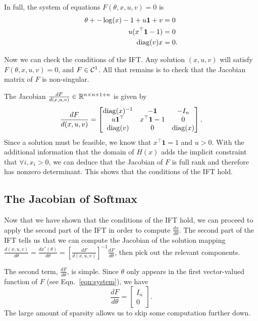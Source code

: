 \documentclass[11pt]{article}
\begin{document}
In full, the system of equations $F(\theta, x,u,v) = 0$ is
\begin{equation}
\label{eqn:system}
\begin{aligned}
\theta + -\log(x) - 1 + u\mathbf{1} + v &= 0\\
u(x^{\top} \mathbf{1} - 1) &= 0\\
\mathrm{diag}(v)x &= 0.
\end{aligned}
\end{equation}

Now we can check the conditions of the IFT.
Any solution $(x,u,v)$ will satisfy $F(\theta, x,u,v) = 0$,
and $F \in \mathcal{C}^1$.
All that remains is to check that the Jacobian matrix of $F$ is non-singular.

The Jacobian $\frac{dF}{d(x,u,v)}\in\mathbb{R}^{n\times n+1+n}$ is given by
\begin{equation}
\label{eqn:f-jac}
\frac{dF}{d(x,u,v)}=
\begin{bmatrix}
\mathrm{diag}(x)^{-1} & -\mathbf{1} & -I_n \\
u\mathbf{1}^\top & x^\top\mathbf{1} - 1 & 0\\
\mathrm{diag}(v) & 0 & \mathrm{diag}(x)
\end{bmatrix}.
\end{equation}
Since a solution must be feasible, we know that $x^\top\mathbf{1} = 1$ and $u > 0$.
With the additional information that the domain of $H(x)$
adds the implicit constraint that $\forall i, x_i > 0$,
we can deduce that the Jacobian of $F$ is full rank and therefore has nonzero determinant.
This shows that the conditions of the IFT hold.


\subsection{The Jacobian of Softmax}
Now that we have shown that the conditions of the IFT hold,
we can proceed to apply the second part of the IFT in order to compute $\frac{dx}{d\theta}$.
The second part of the IFT tells us that we can compute the Jacobian of the
solution mapping $\frac{d(x,u,v)}{d\theta} = \frac{dx^*(\theta)}{d\theta}
= \left[\frac{dF}{d(x,u,v)}\right]^{-1}\frac{dF}{d\theta}$,
then pick out the relevant components.

The second term, $\frac{dF}{d\theta}$, is simple.
Since $\theta$ only appears in the first vector-valued function of $F$
(see Eqn.~\ref{eqn:system}), we have
\begin{equation}
\label{eqn:df-dtheta}
\frac{dF}{d\theta} = \begin{bmatrix}
    I_n\\
    0
\end{bmatrix}.
\end{equation}
The large amount of sparsity allows us to skip some computation further down.
\end{document}
